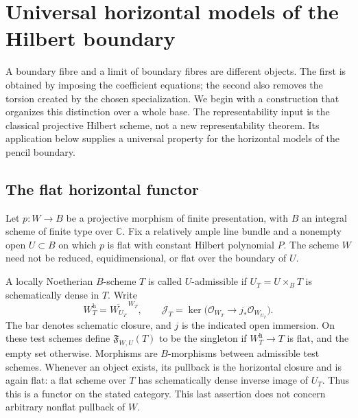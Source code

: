 \documentclass[11pt,reqno]{amsart}
\numberwithin{equation}{section}
\theoremstyle{definition}\newtheorem{definition}[theorem]{Definition}
\theoremstyle{remark}\newtheorem{remark}[theorem]{Remark}
\newcommand{\C}{\mathbb C}\newcommand{\Q}{\mathbb Q}
\newcommand{\OO}{\mathcal O}\newcommand{\II}{\mathcal I}
\begin{document}
\section{Universal horizontal models of the Hilbert boundary}
\label{sec:horizontal-v166}
A boundary fibre and a limit of boundary fibres are different objects.
The first is obtained by imposing the coefficient equations; the second
also removes the torsion created by the chosen specialization. We begin
with a construction that organizes this distinction over a whole base.
The representability input is the classical projective Hilbert scheme,
not a new representability theorem. Its application below supplies a
universal property for the horizontal models of the pencil boundary.

\subsection{The flat horizontal functor}
Let $p:W\to B$ be a projective morphism of finite presentation, with
$B$ an integral scheme of finite type over $\C$. Fix a relatively ample
line bundle and a nonempty open $U\subset B$ on which $p$ is flat with
constant Hilbert polynomial $P$. The scheme $W$ need not be reduced,
equidimensional, or flat over the boundary of $U$.

A locally Noetherian $B$-scheme $T$ is called $U$-admissible if
$U_T=U\times_B T$ is schematically dense in $T$. Write
\begin{equation}\label{eq:horizontal-definition-v166}
 W_T^{\mathrm h}=\overline{W_{U_T}}^{\,W_T},\qquad
 \mathcal J_T=\ker\bigl(\OO_{W_T}\longrightarrow
                       j_*\OO_{W_{U_T}}\bigr).
\end{equation}
The bar denotes schematic closure, and $j$ is the indicated open
immersion. On these test schemes define $\mathfrak F_{W,U}(T)$ to be
the singleton if $W_T^{\mathrm h}\to T$ is flat, and the empty set
otherwise. Morphisms are $B$-morphisms between admissible test schemes.
Whenever an object exists, its pullback is the horizontal closure and
is again flat: a flat scheme over $T$ has schematically dense inverse
image of $U_T$. Thus this is a functor on the stated category. This
last assertion does not concern arbitrary nonflat pullback of $W$.
\end{document}
